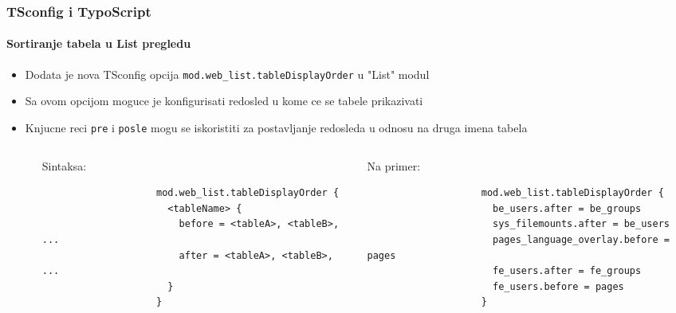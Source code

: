 \begin{frame}[fragile]
	\frametitle{TSconfig i TypoScript}
	\framesubtitle{Sortiranje tabela u List pregledu}

	\lstset{basicstyle=\tiny\ttfamily}

	\begin{itemize}

		\item Dodata je nova TSconfig opcija \texttt{mod.web\_list.tableDisplayOrder} u "List" modul

		\item Sa ovom opcijom moguce je konfigurisati redosled u kome ce se tabele prikazivati

		\item Knjucne reci \texttt{pre} i \texttt{posle} mogu se iskoristiti za postavljanje redosleda u odnosu na druga imena tabela

		\begin{columns}[T]
			\begin{column}{.07\textwidth}
			\end{column}
			\begin{column}{.465\textwidth}

				\small Sintaksa:\normalsize

				\begin{lstlisting}
					mod.web_list.tableDisplayOrder {
					  <tableName> {
					    before = <tableA>, <tableB>, ...
					    after = <tableA>, <tableB>, ...
					  }
					}
				\end{lstlisting}
			\end{column}
			\begin{column}{.465\textwidth}

				\small Na primer:\normalsize

				\begin{lstlisting}
					mod.web_list.tableDisplayOrder {
					  be_users.after = be_groups
					  sys_filemounts.after = be_users
					  pages_language_overlay.before = pages
					  fe_users.after = fe_groups
					  fe_users.before = pages
					}
				\end{lstlisting}

			\end{column}
		\end{columns}

	\end{itemize}

\end{frame}

